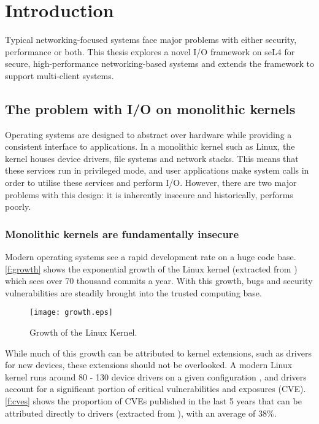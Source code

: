 \chapter{Introduction}\label{ch:intro}

Typical networking-focused systems face major problems with either security, performance or both.
This thesis explores a novel I/O framework on seL4 for secure, high-performance
networking-based systems and extends the framework to support multi-client systems.

\section{The problem with I/O on monolithic kernels}
Operating systems are designed to abstract over hardware while
providing a consistent interface to applications. In a monolithic kernel
such as Linux, the kernel houses device drivers, file systems and network 
stacks. This means that these services run in privileged mode, and user 
applications make system calls in order to utilise these services and perform I/O.
However, there are two major problems with this design:
it is inherently insecure and historically, performs poorly.

\subsection{Monolithic kernels are fundamentally insecure}
Modern operating systems see a rapid development rate on a huge code base.
\autoref{f:growth} shows the exponential growth of the Linux kernel
(extracted from \cite{Linux:archives}) which sees over 70 thousand commits a year.
With this growth, bugs and security vulnerabilities are steadily brought into the 
trusted computing base.

\begin{figure}[h]
  \centering
  \texttt{[image: growth.eps]}
  \caption{Growth of the Linux Kernel.}
  \label{f:growth}
\end{figure}

While much of this growth can be attributed to kernel extensions, such as drivers for new devices,
these extensions should not be overlooked. A modern Linux kernel runs around 80 - 130
device drivers on a given configuration \cite{Linux:LKDDB}, and drivers account for a significant
portion of critical vulnerabilities and exposures (CVE). \autoref{f:cves} shows the proportion of 
CVEs published in the last 5 years that can be attributed directly to drivers (extracted 
from \cite{Linux:CVEs}), with an average of 38\%.

